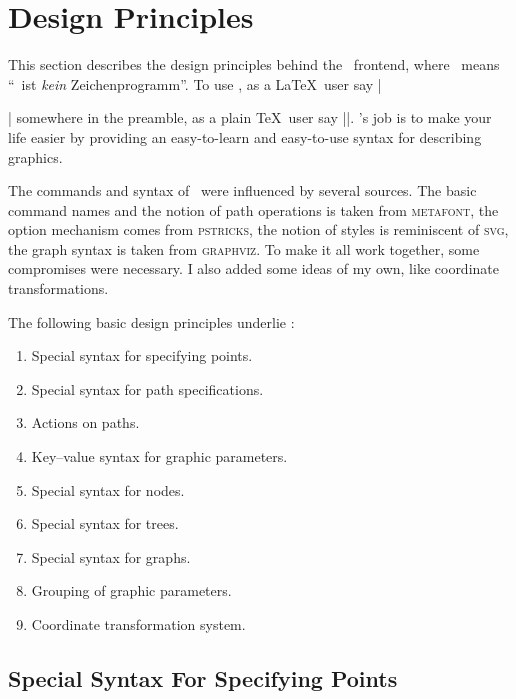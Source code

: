 %
%
%


\section[tikz-design]{Design Principles}

This section describes the design principles behind the \tikzname\ frontend,
where \tikzname\ means ``\tikzname\ ist \emph{kein} Zeichenprogramm''. To use
\tikzname, as a \LaTeX\ user say |\usepackage{tikz}| somewhere in the preamble,
as a plain \TeX\ user say ||. \tikzname's job is to make your
life easier by providing an easy-to-learn and easy-to-use syntax for describing
graphics.

The commands and syntax of \tikzname\ were influenced by several sources. The
basic command names and the notion of path operations is taken from
\textsc{metafont}, the option mechanism comes from \textsc{pstricks}, the
notion of styles is reminiscent of \textsc{svg}, the graph syntax is taken from
\textsc{graphviz}. To make it all work together, some compromises were
necessary. I also added some ideas of my own, like coordinate transformations.

The following basic design principles underlie \tikzname:
%
\begin{enumerate}
    \item Special syntax for specifying points.
    \item Special syntax for path specifications.
    \item Actions on paths.
    \item Key--value syntax for graphic parameters.
    \item Special syntax for nodes.
    \item Special syntax for trees.
    \item Special syntax for graphs.
    \item Grouping of graphic parameters.
    \item Coordinate transformation system.
\end{enumerate}


\subsection{Special Syntax For Specifying Points}

